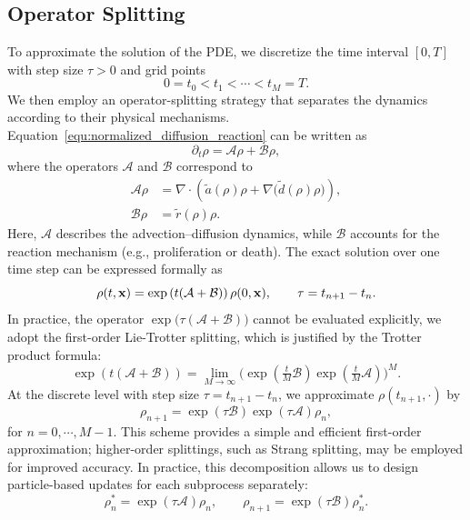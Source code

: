 \documentclass[12pt]{article}
\begin{document}
\subsection{Operator Splitting}
To approximate the solution of the PDE, we discretize the time interval $[0,T]$ with step size $\tau>0$ and grid points
\[
0 = t_0 < t_1 < \cdots < t_M = T.
\]
We then employ an operator-splitting strategy that separates the dynamics according to their physical mechanisms. 
Equation~\eqref{equ:normalized_diffusion_reaction} can be written as
\begin{equation}
\partial_t \rho = \mathcal{A}\rho + \mathcal{B}\rho ,
\end{equation}
where the operators $\mathcal{A}$ and $\mathcal{B}$ correspond to
\begin{align}
\mathcal{A}\rho &= \nabla \cdot \left( \tilde a(\rho)\rho + \nabla \!\big(\tilde d(\rho)\rho \big) \right), \\[4pt]
\mathcal{B}\rho &= \tilde r(\rho)\rho .
\end{align}
Here, $\mathcal{A}$ describes the advection--diffusion dynamics, while $\mathcal{B}$ accounts for the reaction mechanism (e.g., proliferation or death).  The exact solution over one time step can be expressed formally as
\begin{equation}
\rho(t,\mathbf{x}) = \exp\left( t (\mathcal{A} + \mathcal{B}) \right)\rho(0,\mathbf{x}),
\qquad \tau = t_{n+1}-t_n .
\end{equation}
In practice, the operator $\exp\!\big(\tau(\mathcal{A}+\mathcal{B})\big)$ cannot be evaluated explicitly, 
we adopt the first-order Lie-Trotter splitting, which is justified by the Trotter product formula:
\begin{equation}
\exp\!\left( t (\mathcal{A} + \mathcal{B}) \right) 
= \lim_{M\to\infty} \Big( \exp\!\left(\tfrac{t}{M} \mathcal{B}\right) 
                          \exp\!\left(\tfrac{t}{M} \mathcal{A}\right) \Big)^M .
\end{equation}
At the discrete level with step size $\tau = t_{n+1}-t_n$, we approximate $\rho(t_{n+1},\cdot)$ by
\begin{equation}
\rho_{n+1} = \exp(\tau \mathcal{B}) \exp(\tau \mathcal{A}) \rho_n ,
\end{equation}
for $n=0,\cdots,M-1$.
This scheme provides a simple and efficient first-order approximation; 
higher-order splittings, such as Strang splitting, may be employed for improved accuracy.
In practice, this decomposition allows us to design particle-based updates for each subprocess separately:
\begin{equation}
\rho_n^\ast = \exp(\tau \mathcal{A})\rho_n, 
\qquad 
\rho_{n+1} = \exp(\tau \mathcal{B})\rho_n^\ast .
\end{equation}
\end{document}
